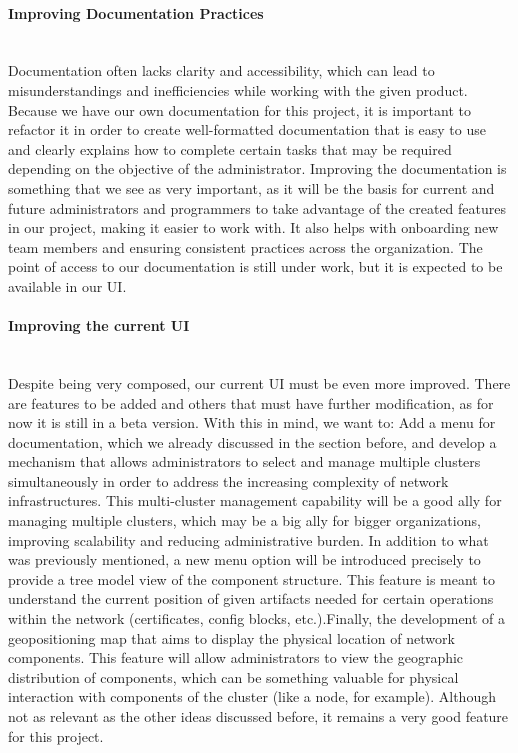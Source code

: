 \paragraph{Improving Documentation Practices}\mbox{}\\
Documentation often lacks clarity and accessibility, which can lead to misunderstandings and inefficiencies while working with the given product. Because we have our own documentation for this project, it is important to refactor it in order to create well-formatted documentation that is easy to use and clearly explains how to complete certain tasks that may be required depending on the objective of the administrator. Improving the documentation is something that we see as very important, as it will be the basis for current and future administrators and programmers to take advantage of the created features in our project, making it easier to work with. It also helps with onboarding new team members and ensuring consistent practices across the organization. The point of access to our documentation is still under work, but it is expected to be available in our UI.


\paragraph{Improving the current UI}\mbox{}\\
Despite being very composed, our current UI must be even more improved. There are features to be added and others that must have further modification, as for now it is still in a beta version. With this in mind, we want to: Add a menu for documentation, which we already discussed in the section before, and develop a mechanism that allows administrators to select and manage multiple clusters simultaneously in order to address the increasing complexity of network infrastructures. This multi-cluster management capability will be a good ally for managing multiple clusters, which may be a big ally for bigger organizations, improving scalability and reducing administrative burden. In addition to what was previously mentioned, a new menu option will be introduced precisely to provide a tree model view of the component structure. This feature is meant to understand the current position of given artifacts needed for certain operations within the network (certificates, config blocks, etc.).Finally, the development of a geopositioning map that aims to display the physical location of network components. This feature will allow administrators to view the geographic distribution of components, which can be something valuable for physical interaction with components of the cluster (like a node, for example). Although not as relevant as the other ideas discussed before, it remains a very good feature for this project.

